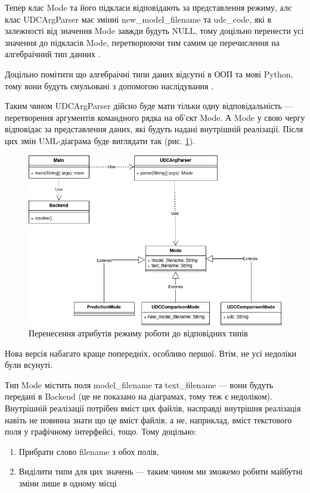 \documentclass[14pt]{extarticle}
\begin{document}
  Тепер клас Mode та його підкласи відповідають за представлення режиму,
  алє клас UDCArgParser має змінні new\_model\_filename та udc\_code,
  які в залежності від значення Mode завжди будуть NULL,
  тому доцільно перенести усі значення до підкласів Mode,
  перетворюючи тим самим це перечислення на алгебраічний тип данних
  \cite{ADT_wiki}.
  
  Доцільно помітити що алгебраічні типи даних відсутні в ООП та мові Python,
  тому вони будуть ємульовані з допомогою наслідування
  \cite{Code_complete_34_4, ADT_composition_over_inheritance}.
  
  Таким чином UDCArgParser дійсно буде мати тільки одну відповідальність ---
  перетворення аргументів командного рядка на об'єкт Mode.
  А Mode у свою чергу відповідає за представлення даних,
  які будуть надані внутрішній реалізації.
  Після цих змін UML-діаграма буде виглядати так (рис. \ref{fig:io_uml4}).

  \begin{figure}[H]
    \centering
    \includegraphics[width=\textwidth]{io_uml4.drawio.png}    
    \caption{Перенесення атрибутів режиму роботи до відповідних типів}
    \label{fig:io_uml4}
  \end{figure}
  
  Нова версія набагато краще попередніх, особливо першої.
  Втім, не усі недоліки були всунуті.
  
  Тип Mode містить поля model\_filename та text\_filename
  --- вони будуть передані в Backend
  (це не показано на діаграмах, тому теж є недоліком).
  Внутрішній реалізації потрібен вміст цих файлів,
  насправді внутрішня реалізація навіть не повинна знати що це вміст файлів,
  а не, наприклад, вміст текстового поля у графічному інтерфейсі, тощо.
  Тому доцільно:
    \begin{enumerate}[labelindent=\dimexpr\parindent\relax, leftmargin=*]
      \item Прибрати слово filename з обох полів,
      \item Виділити типи для цих значень ---
      таким чином ми зможемо робити майбутні зміни лише в одному місці
      \cite{Code_complete_5_3}
    \end{enumerate}
    
\end{document}
